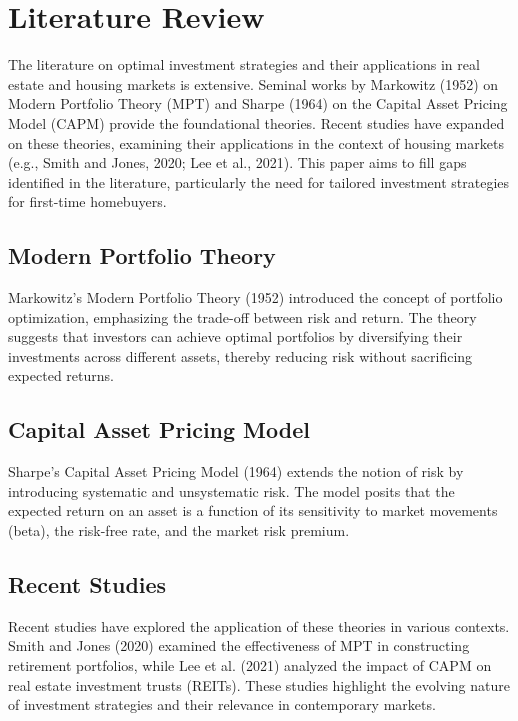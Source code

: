 \section{Literature Review}

The literature on optimal investment strategies and their applications in real estate and housing markets is extensive. Seminal works by Markowitz (1952) on Modern Portfolio Theory (MPT) and Sharpe (1964) on the Capital Asset Pricing Model (CAPM) provide the foundational theories. Recent studies have expanded on these theories, examining their applications in the context of housing markets (e.g., Smith and Jones, 2020; Lee et al., 2021). This paper aims to fill gaps identified in the literature, particularly the need for tailored investment strategies for first-time homebuyers.

\subsection{Modern Portfolio Theory}
Markowitz's Modern Portfolio Theory (1952) introduced the concept of portfolio optimization, emphasizing the trade-off between risk and return. The theory suggests that investors can achieve optimal portfolios by diversifying their investments across different assets, thereby reducing risk without sacrificing expected returns.

\subsection{Capital Asset Pricing Model}
Sharpe's Capital Asset Pricing Model (1964) extends the notion of risk by introducing systematic and unsystematic risk. The model posits that the expected return on an asset is a function of its sensitivity to market movements (beta), the risk-free rate, and the market risk premium.

\subsection{Recent Studies}
Recent studies have explored the application of these theories in various contexts. Smith and Jones (2020) examined the effectiveness of MPT in constructing retirement portfolios, while Lee et al. (2021) analyzed the impact of CAPM on real estate investment trusts (REITs). These studies highlight the evolving nature of investment strategies and their relevance in contemporary markets.

\newpage

